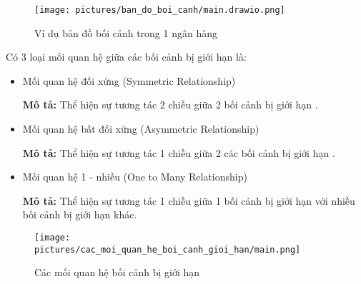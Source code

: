 \begin{figure}[H]

\centering

\texttt{[image: pictures/ban\_do\_boi\_canh/main.drawio.png]}

\caption{Ví dụ bản đồ bối cảnh trong 1 ngân hàng}

\end{figure}












Có 3 loại mối quan hệ giữa các bối cảnh bị giới hạn là:

\begin{itemize}

\item Mối quan hệ đối xứng (Symmetric Relationship)

\textbf{Mô tả:} Thể hiện sự tương tác 2 chiều giữa 2 bối cảnh bị giới hạn .

\item Mối quan hệ bất đối xứng (Asymmetric Relationship)

\textbf{Mô tả:} Thể hiện sự tương tác 1 chiều giữa 2 các bối cảnh bị giới hạn .

\item Mối quan hệ 1 - nhiều (One to Many Relationship)

\textbf{Mô tả:} Thể hiện sự tương tác 1 chiều giữa 1 bối cảnh bị giới hạn với nhiều bối cảnh bị giới hạn khác.

\end{itemize}

\begin{figure}[H]

\centering

\texttt{[image: pictures/cac\_moi\_quan\_he\_boi\_canh\_gioi\_han/main.png]}

\caption{Các mối quan hệ bối cảnh bị giới hạn}

\end{figure}

